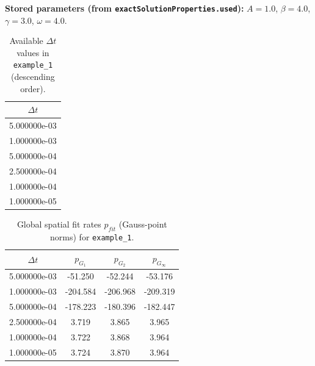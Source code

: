 \documentclass[11pt,a4paper]{article}
\begin{document}
\textbf{Stored parameters (from \texttt{exactSolutionProperties.used}):} $A=1.0$, $\beta=4.0$, $\gamma=3.0$, $\omega=4.0$.
\begin{table}[htbp]
\centering
\small
\caption{Available $\Delta t$ values in \texttt{example\_1} (descending order).}
\begin{tabular}{c}
\toprule
$\Delta t$ \\
\midrule
5.000000e-03 \\
1.000000e-03 \\
5.000000e-04 \\
2.500000e-04 \\
1.000000e-04 \\
1.000000e-05 \\
\bottomrule
\end{tabular}
\end{table}
\begin{table}[htbp]
\centering
\scriptsize
\caption{Global spatial fit rates $p_{fit}$ (cell-centered norms) for \texttt{example\_1}.}
\end{table}
\begin{table}[htbp]
\centering
\scriptsize
\caption{Global spatial fit rates $p_{fit}$ (Gauss-point norms) for \texttt{example\_1}.}
\begin{tabular}{cccc}
\toprule
$\Delta t$ & $p_{G_1}$ & $p_{G_2}$ & $p_{G_\infty}$ \\
\midrule
5.000000e-03 & -51.250 & -52.244 & -53.176 \\
1.000000e-03 & -204.584 & -206.968 & -209.319 \\
5.000000e-04 & -178.223 & -180.396 & -182.447 \\
2.500000e-04 & 3.719 & 3.865 & 3.965 \\
1.000000e-04 & 3.722 & 3.868 & 3.964 \\
1.000000e-05 & 3.724 & 3.870 & 3.964 \\
\bottomrule
\end{tabular}
\end{table}
\end{document}
